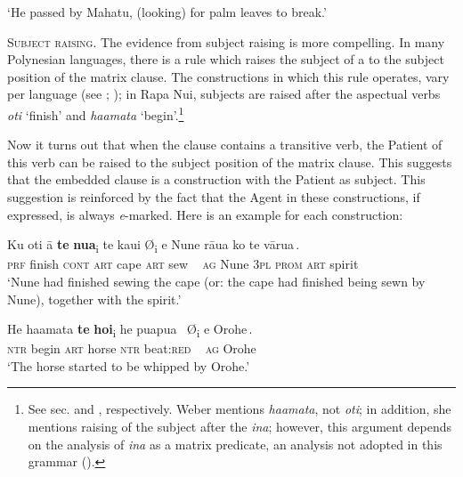 \glt 
‘He passed by Mahatu, (looking) for palm leaves to break.’ \textstyleExampleref{[R304.111]} 
\z

\textsc{Subject raising.} The evidence from subject raising is more compelling. In many Polynesian languages, there is a rule which raises the subject of a  to the subject position of the matrix clause. The constructions in which this rule operates, vary per language (see \citealt[132]{Chung1978}; \citealt[57]{WeberN2003}); in Rapa Nui, subjects are raised after the aspectual verbs \textit{oti} ‘finish’ and \textit{\mbox{ha{\ꞌ}amata}} ‘begin’.\footnote{\label{fn:413}See sec.  and , respectively. Weber mentions \textit{ha{\ꞌ}amata}, not \textit{oti}; in addition, she mentions raising of the subject after the  \textit{{\ꞌ}ina}; however, this argument depends on the analysis of \textit{{\ꞌ}ina} as a matrix predicate, an analysis not adopted in this grammar ().} 

Now it turns out that when the  clause contains a transitive verb, the Patient of this verb can be raised to the subject position of the matrix clause. This suggests that the embedded clause is a  construction with the Patient as subject. This suggestion is reinforced by the fact that the Agent in these constructions, if expressed, is always \textit{e}{}-marked. Here is an example for each construction:

\ea\label{ex:8.51}
\gll Ku oti {\ꞌ}ā \textbf{te} \textbf{nua}\textsubscript{\textup{i}} {\ob}te kaui \textup{Ø}\textsubscript{\textup{i}} e Nune rāua ko te vārua\,{\cb}.\\
\textsc{prf} finish \textsc{cont} \textsc{art} cape {\db}\textsc{art} sew ~ \textsc{ag} Nune \textsc{3pl} \textsc{prom} \textsc{art} spirit\\

\glt 
‘Nune had finished sewing the cape (or: the cape had finished being sewn by Nune), together with the spirit.’ \textstyleExampleref{[Mtx-7-09.051]}
\z

\ea\label{ex:8.52}
\gll He ha{\ꞌ}amata \textbf{te} \textbf{hoi}\textsubscript{\textup{i}} {\ob}he pu{\ꞌ}apu{\ꞌ}a ~\textup{Ø}\textsubscript{\textup{i}} e {\ꞌ}Orohe\,{\cb}.\\
\textsc{ntr} begin \textsc{art} horse {\db}\textsc{ntr} beat:\textsc{red} ~ \textsc{ag} Orohe\\

\glt
‘The horse started to be whipped by Orohe.’  
\z

